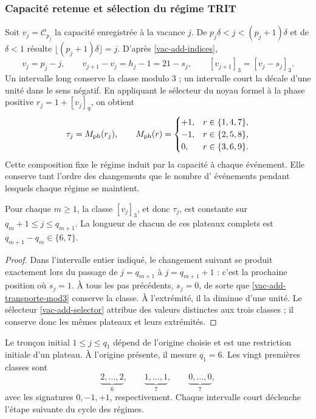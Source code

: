 \subsubsection{Capacité retenue et sélection du régime TRIT}
\label{vac-add-regimen}

Soit \(v_j=\mathcal C_{p_j}\) la capacité enregistrée à la vacance
\(j\). De \(p_j\delta<j<(p_j+1)\delta\) et de \(\delta<1\) résulte
\(\lfloor(p_j+1)\delta\rfloor=j\). D'après
\eqref{vac-add-indices},
\begin{equation}
 v_j=p_j-j,
 \qquad v_{j+1}-v_j=h_j-1=21-s_j,
 \qquad [v_{j+1}]_3=[v_j-s_j]_3.
 \label{vac-add-transporte-mod3}
\end{equation}
Un intervalle long conserve la classe modulo \(3\) ; un intervalle court la décale d'une unité dans le sens négatif. En appliquant le sélecteur du noyau formel à la phase positive \(r_j=1+[v_j]_9\), on obtient
\begin{equation}
 \tau_j=M_{\rm ph}(r_j),\qquad
 M_{\rm ph}(r)=
 \begin{cases}
 +1,&r\in\{1,4,7\},\\
 -1,&r\in\{2,5,8\},\\
 0,&r\in\{3,6,9\}.
 \end{cases}
 \label{vac-add-selector}
\end{equation}
Cette composition fixe le régime induit par la capacité à chaque
événement. Elle conserve tant l'ordre des changements que le nombre d'
événements pendant lesquels chaque régime se maintient.

\begin{corollary}
\label{vac-add-mesetas}
Pour chaque \(m\geq1\), la classe \([v_j]_3\), et donc
\(\tau_j\), est constante sur
\(q_m+1\leq j\leq q_{m+1}\). La longueur de chacun de ces
plateaux complets est \(q_{m+1}-q_m\in\{6,7\}\).
\end{corollary}
\begin{proof}
Dans l'intervalle entier indiqué, le changement suivant se produit exactement lors du passage de \(j=q_{m+1}\) à \(j=q_{m+1}+1\) : c'est la prochaine position où \(s_j=1\). À tous les pas précédents, \(s_j=0\), de sorte que \eqref{vac-add-transporte-mod3} conserve la classe. À l'extrémité, il la diminue d'une unité. Le sélecteur \eqref{vac-add-selector} attribue des valeurs distinctes aux trois classes ; il conserve donc les mêmes plateaux et leurs extrémités.
\end{proof}

Le tronçon initial \(1\leq j\leq q_1\) dépend de l'origine choisie et
est une restriction initiale d'un plateau. À l'origine présente, il mesure
\(q_1=6\). Les vingt premières classes sont
\[
 \underbrace{2,\ldots,2}_{6},\qquad
 \underbrace{1,\ldots,1}_{7},\qquad
 \underbrace{0,\ldots,0}_{7},
\]
avec les signatures \(0,-1,+1\), respectivement. Chaque intervalle court
déclenche l'étape suivante du cycle des régimes.


